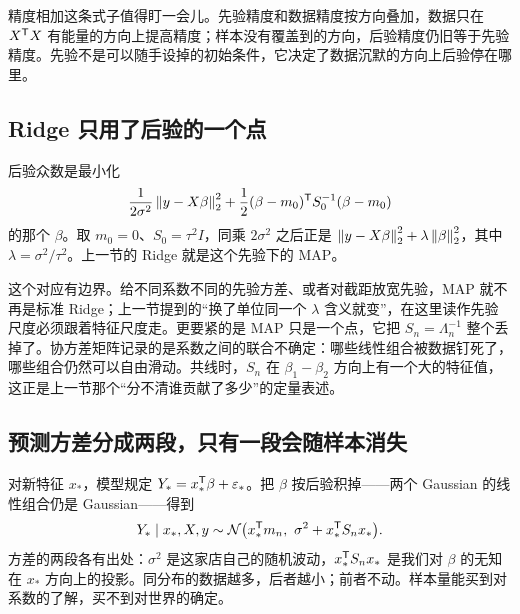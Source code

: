 精度相加这条式子值得盯一会儿。先验精度和数据精度按方向叠加，数据只在 \(X^{\mathsf{T}}X\) 有能量的方向上提高精度；样本没有覆盖到的方向，后验精度仍旧等于先验精度。先验不是可以随手设掉的初始条件，它决定了数据沉默的方向上后验停在哪里。

\subsection{Ridge 只用了后验的一个点}

后验众数是最小化
\[
\frac{1}{2\sigma^2}\left\lVert y-X\beta\right\rVert_2^2+\frac12(\beta-m_0)^{\mathsf{T}}S_0^{-1}(\beta-m_0)
\]
的那个 \(\beta\)。取 \(m_0=0\)、\(S_0=\tau^2I\)，同乘 \(2\sigma^2\) 之后正是 \(\left\lVert y-X\beta\right\rVert_2^2+\lambda\left\lVert\beta\right\rVert_2^2\)，其中 \(\lambda=\sigma^2/\tau^2\)。上一节的 Ridge 就是这个先验下的 MAP。

这个对应有边界。给不同系数不同的先验方差、或者对截距放宽先验，MAP 就不再是标准 Ridge；上一节提到的``换了单位同一个 \(\lambda\) 含义就变''，在这里读作先验尺度必须跟着特征尺度走。更要紧的是 MAP 只是一个点，它把 \(S_n=\Lambda_n^{-1}\) 整个丢掉了。协方差矩阵记录的是系数之间的联合不确定：哪些线性组合被数据钉死了，哪些组合仍然可以自由滑动。共线时，\(S_n\) 在 \(\beta_1-\beta_2\) 方向上有一个大的特征值，这正是上一节那个``分不清谁贡献了多少''的定量表述。

\subsection{预测方差分成两段，只有一段会随样本消失}

对新特征 \(x_*\)，模型规定 \(Y_*=x_*^{\mathsf{T}}\beta+\varepsilon_*\)。把 \(\beta\) 按后验积掉——两个 Gaussian 的线性组合仍是 Gaussian——得到
\[
Y_*\mid x_*,X,y\sim\mathcal N\bigl(x_*^{\mathsf{T}}m_n,\ \sigma^2+x_*^{\mathsf{T}}S_nx_*\bigr).
\]
方差的两段各有出处：\(\sigma^2\) 是这家店自己的随机波动，\(x_*^{\mathsf{T}}S_nx_*\) 是我们对 \(\beta\) 的无知在 \(x_*\) 方向上的投影。同分布的数据越多，后者越小；前者不动。样本量能买到对系数的了解，买不到对世界的确定。

\begin{center}
\end{center}

